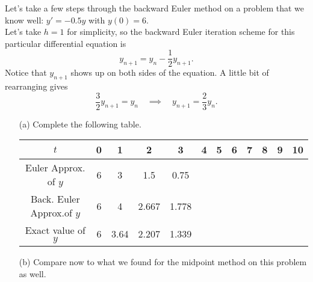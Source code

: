 \begin{problem}
    Let's take a few steps through the backward Euler method on a problem that we know
    well: $y' = -0.5y$ with $y(0) = 6$.  \\
    Let's take $h=1$ for simplicity, so the backward Euler iteration scheme for this
    particular differential equation is
    \[ y_{n+1} = y_n - \frac{1}{2} y_{n+1}. \]
    Notice that $y_{n+1}$ shows up on both sides of the equation.  A little bit of
    rearranging gives 
    \[ \frac{3}{2} y_{n+1} = y_n \quad \implies \quad y_{n+1} = \frac{2}{3} y_n. \]
    \begin{enumerate}
        \item[(a)] Complete the following table.
            \begin{center}
                \begin{tabular}{|c|c|c|c|c|c|c|c|c|c|c|c|}
                    \hline
                    $t$ & 0 & 1 & 2 & 3 & 4 & 5 & 6 & 7 & 8 & 9 & 10 \\ \hline
                    Euler Approx. of $y$ & 6 & 3  & 1.5  & 0.75  &   &   &   &   &   &   &   \\ \hline
                    Back. Euler Approx.of $y$ & 6 & 4  & 2.667  & 1.778  &   &   &   &   &   &   &   \\ \hline
                    Exact value of $y$ & 6 & 3.64  & 2.207  & 1.339  &   &   &   &   &   &   &   \\ \hline
                \end{tabular}
            \end{center}
        \item[(b)] Compare now to what we found for the midpoint method on this problem as
            well.
    \end{enumerate}
\end{problem}

